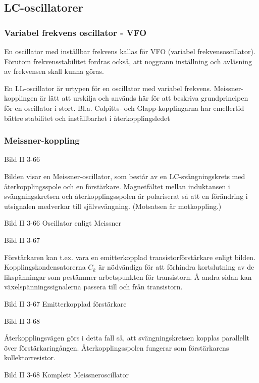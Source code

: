 \subsection{LC-oscillatorer}

\subsubsection{Variabel frekvens oscillator - VFO}

En oscillator med inställbar frekvens kallas för VFO (variabel
frekvensoscillator). Förutom frekvensstabilitet fordras också, att
noggrann inställning och avläsning av frekvensen skall kunna göras.

En LL-oscillator är urtypen för en oscillator med variabel
frekvens. Meissner-kopplingen är lätt att urskilja och används här för
att beskriva grundprincipen för en oscillator i stort. Bl.a. Colpitts-
och Glapp-kopplingarna har emellertid bättre stabilitet och
inställbarhet i återkopplingsledet

\subsubsection{Meissner-koppling}

Bild II 3-66

Bilden visar en Meissner-oscillator, som består av en
LC-svängningskrets med återkopplingsspole och en
förstärkare. Magnetfältet mellan induktansen i svängningskretsen och
återkopplingsspolen är polariserat så att en förändring i utsignalen
medverkar till självsvängning. (Motsatsen är motkoppling.)

Bild II 3-66 Oscillator enligt Meissner

Bild II 3-67

Förstärkaren kan t.ex. vara en emitterkopplad transistorförstärkare
enligt bilden.  Kopplingskondensatorerna \(C_k\) är nödvändiga för att
förhindra kortslutning av de likspänningar som pestämmer arbetspunkten
för transistorn. Å andra sidan kan växelspänningssignalerna passera
till och från transistorn.

Bild II 3-67 Emitterkopplad förstärkare

Bild II 3-68

Återkopplingsvägen görs i detta fall så, att svängningskretsen kopplas
parallellt över förstärkaringången. Återkopplingsspolen fungerar som
förstärkarens kollektorresistor.

Bild II 3-68 Komplett Meissneroscillator

